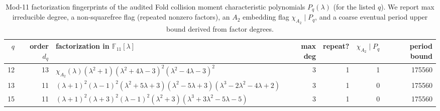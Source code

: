 \begin{table}[H]
\centering
\scriptsize
\setlength{\tabcolsep}{5pt}
\caption{Mod-11 factorization fingerprints of the audited Fold collision moment characteristic polynomials $P_q(\lambda)$ (for the listed $q$). We report max irreducible degree, a non-squarefree flag (repeated nonzero factors), an $A_2$ embedding flag $\chi_{A_2}\mid P_q$, and a coarse eventual period upper bound derived from factor degrees.}
\label{tab:fold_collision_charpoly_mod11_fingerprint_q12_15}
\begin{tabular}{r r l r r r r}
\toprule
$q$ & order $d_q$ & factorization in $\mathbb{F}_{11}[\lambda]$ & max deg & repeat? & $\chi_{A_2}\mid P_q$ & period bound\\
\midrule
12 & 13 & $\chi_{A_2}(\lambda) \left(\lambda^{2} + 1\right) \left(\lambda^{2} + 4\lambda - 3\right)^{2} \left(\lambda^{2} - 4\lambda - 3\right)^{2}$ & 3 & 1 & 1 & 175560\\
13 & 11 & $\left(\lambda + 1\right)^{2} \left(\lambda - 1\right)^{2} \left(\lambda^{2} + 5\lambda + 3\right) \left(\lambda^{2} - 5\lambda + 3\right) \left(\lambda^{3} - 2\lambda^{2} - 4\lambda + 2\right)$ & 3 & 1 & 0 & 175560\\
15 & 11 & $\left(\lambda + 1\right)^{2} \left(\lambda + 3\right)^{2} \left(\lambda - 1\right)^{2} \left(\lambda^{2} + 3\right) \left(\lambda^{3} + 3\lambda^{2} - 5\lambda - 5\right)$ & 3 & 1 & 0 & 175560\\
\bottomrule
\end{tabular}
\end{table}

